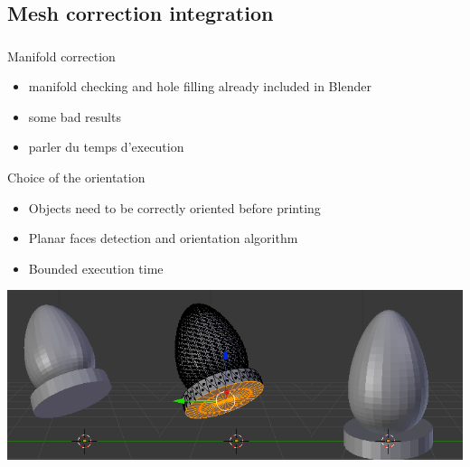 \documentclass{beamer}
\begin{document}
\subsection{Mesh correction integration}
\begin{frame}
	\frametitle{}

    \begin{block}{Manifold correction}
		\begin{itemize}
			\item manifold checking and hole filling already included in Blender
			\item some bad results
			\item parler du temps d'execution
		\end{itemize}
    \end{block}
\end{frame}
\begin{frame}
	\begin{block}{Choice of the orientation}
		\begin{itemize}
			\item Objects need to be correctly oriented before printing
			\item Planar faces detection and orientation algorithm
			\item Bounded execution time
		\end{itemize}
    \end{block}

	\begin{center}
		\includegraphics[width=\textwidth]{pf_detect}
	\end{center}
\end{frame}
\end{document}
